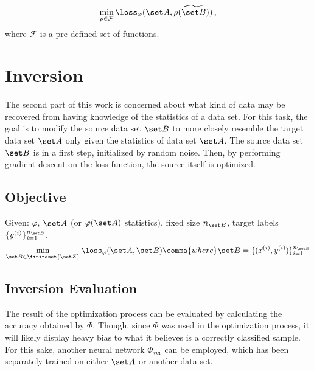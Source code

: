 \[
    \min_{\rho \in \mathcal{F}} \loss _\varphi (\set A, \rho(\widetilde{\set B})) \,,
\]
where $\mathcal F$ is a pre-defined set of functions.








\section{Inversion}
\label{sec:Inversion}



The second part of this work is concerned about what kind of data may be recovered from 
having knowledge of the statistics of a data set.
For this task, the goal is to modify the source data set $\set B$ to more closely resemble
the target data set $\set A$ only given the statistics of data set $\set A$.
The source data set $\set B$ is in a first step, initialized by random noise.
Then, by performing gradient descent on the loss function, the source itself is optimized.



\subsection{Objective}
Given: $\varphi$, $\set A$ (or $\varphi(\set A)$ statistics), 
fixed size $n_{\set B}$, target labels $\{y^{(i)}\}_{i=1}^{n_{\set B}}$.
\[
    \min_{\set B \in \finiteset {\set Z}} \loss _\varphi (\set A, \set B) \comma{where} 
    \set B = \{(\vec x^{(i)}, y^{(i)})\}_{i=1}^{n_{\set B}}
\]
    


\subsection{Inversion Evaluation}
The result of the optimization process can be evaluated by calculating the accuracy obtained by $\Phi$. 
Though, since $\Phi$ was used in the optimization process, it will likely display heavy bias to what it believes is a correctly classified sample.
For this sake, another neural network $\Phi_{\text{ver}}$ can be employed, which has been separately trained on either $\set A$ or another data set. 




